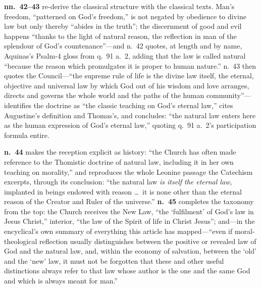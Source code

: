 \textbf{nn.~42--43} re-derive the classical structure with the classical texts. Man's freedom, ``patterned on God's freedom,'' is not negated by obedience to divine law but only thereby ``abides in the truth''; the discernment of good and evil happens ``thanks to the light of natural reason, the reflection in man of the splendour of God's countenance''---and n.~42 quotes, at length and by name, Aquinas's Psalm-4 gloss from q.~91 a.~2, adding that the law is called natural ``because the reason which promulgates it is proper to human nature.'' n.~43 then quotes the Council---``the supreme rule of life is the divine law itself, the eternal, objective and universal law by which God out of his wisdom and love arranges, directs and governs the whole world and the paths of the human community''---identifies the doctrine as ``the classic teaching on God's eternal law,'' cites Augustine's definition and Thomas's, and concludes: ``the natural law enters here as the human expression of God's eternal law,'' quoting q.~91 a.~2's participation formula entire.

\textbf{n.~44} makes the reception explicit as history: ``the Church has often made reference to the Thomistic doctrine of natural law, including it in her own teaching on morality,'' and reproduces the whole Leonine passage the Catechism excerpts, through its conclusion: ``the natural law \emph{is itself the eternal law}, implanted in beings endowed with reason \ldots\ it is none other than the eternal reason of the Creator and Ruler of the universe.'' \textbf{n.~45} completes the taxonomy from the top: the Church receives the New Law, ``the `fulfilment' of God's law in Jesus Christ,'' interior, ``the law of the Spirit of life in Christ Jesus''; and---in the encyclical's own summary of everything this article has mapped---``even if moral-theological reflection usually distinguishes between the positive or revealed law of God and the natural law, and, within the economy of salvation, between the `old' and the `new' law, it must not be forgotten that these and other useful distinctions always refer to that law whose author is the one and the same God and which is always meant for man.''

